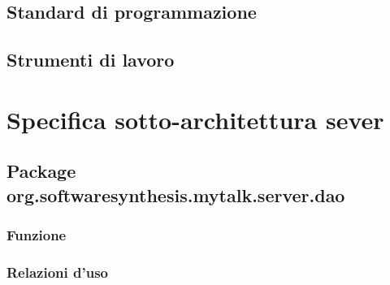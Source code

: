 \subsection{Standard di programmazione}

\subsection{Strumenti di lavoro}

\clearpage

\section{Specifica sotto-architettura sever}\label{sec:serverarchitecture}

\subsection{Package org.softwaresynthesis.mytalk.server.dao}\label{sec:dao}


\subsubsection*{Funzione}

\subsubsection*{Relazioni d'uso}


